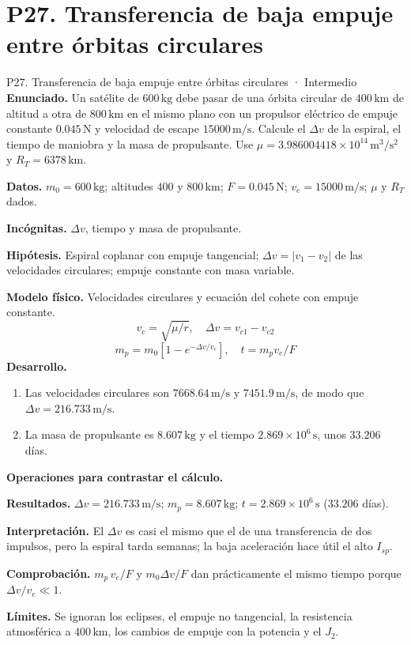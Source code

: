 \section{P27. Transferencia de baja empuje entre órbitas circulares}
\begin{studiumworked}{P27. Transferencia de baja empuje entre órbitas circulares · Intermedio}
\textbf{Enunciado.} Un satélite de $600\,\mathrm{kg}$ debe pasar de una órbita circular de $400\,\mathrm{km}$ de altitud a otra de $800\,\mathrm{km}$ en el mismo plano con un propulsor eléctrico de empuje constante $0.045\,\mathrm N$ y velocidad de escape $15000\,\mathrm{m/s}$. Calcule el $\Delta v$ de la espiral, el tiempo de maniobra y la masa de propulsante. Use $\mu=3.986004418\times10^{14}\,\mathrm{m^3/s^2}$ y $R_T=6378\,\mathrm{km}$.

\textbf{Datos.} $m_0=600\,\mathrm{kg}$; altitudes $400$ y $800\,\mathrm{km}$; $F=0.045\,\mathrm N$; $v_e=15000\,\mathrm{m/s}$; $\mu$ y $R_T$ dados.

\textbf{Incógnitas.} $\Delta v$, tiempo y masa de propulsante.

\textbf{Hipótesis.} Espiral coplanar con empuje tangencial; $\Delta v=|v_1-v_2|$ de las velocidades circulares; empuje constante con masa variable.

\textbf{Modelo físico.} Velocidades circulares y ecuación del cohete con empuje constante.
\[v_c=\sqrt{\mu/r},\quad \Delta v=v_{c1}-v_{c2}\]
\[m_p=m_0[1-e^{-\Delta v/v_e}],\quad t=m_pv_e/F\]
\textbf{Desarrollo.}
\begin{enumerate}
\item Las velocidades circulares son $7668.64\,\mathrm{m/s}$ y $7451.9\,\mathrm{m/s}$, de modo que $\Delta v=216.733\,\mathrm{m/s}$.
\item La masa de propulsante es $8.607\,\mathrm{kg}$ y el tiempo $2.869\times10^{6}\,\mathrm s$, unos $33.206$ días.
\end{enumerate}
\textbf{Operaciones para contrastar el cálculo.}

\textbf{Resultados.} $\Delta v=216.733\,\mathrm{m/s}$; $m_p=8.607\,\mathrm{kg}$; $t=2.869\times10^{6}\,\mathrm s$ ($33.206$ días).

\textbf{Interpretación.} El $\Delta v$ es casi el mismo que el de una transferencia de dos impulsos, pero la espiral tarda semanas; la baja aceleración hace útil el alto $I_{sp}$.

\textbf{Comprobación.} $m_p\,v_e/F$ y $m_0\Delta v/F$ dan prácticamente el mismo tiempo porque $\Delta v/v_e\ll1$.

\textbf{Límites.} Se ignoran los eclipses, el empuje no tangencial, la resistencia atmosférica a $400\,\mathrm{km}$, los cambios de empuje con la potencia y el $J_2$.
\end{studiumworked}
